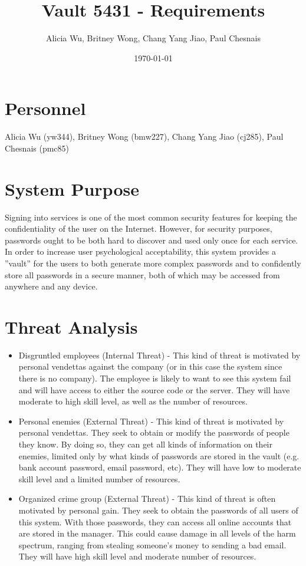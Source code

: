 \documentclass{article}
\title{Vault 5431 - Requirements}
\author{Alicia Wu, Britney Wong, Chang Yang Jiao, Paul Chesnais}
\date{\today}
\begin{document}
\maketitle
\thispagestyle{empty}

\section{Personnel}
\label{sec:personel}
Alicia Wu (yw344), Britney Wong (bmw227), Chang Yang Jiao (cj285), Paul Chesnais (pmc85)

\section{System Purpose}
\label{sec:system_purpose}

Signing into services is one of the most common security features for keeping the confidentiality of the user on the Internet. However, for security purposes, passwords ought to be both hard to discover and used only once for each service. In order to increase user psychological acceptability, this system provides a ''vault'' for the users to both generate more complex passwords and to confidently store all passwords in a secure manner, both of which may be accessed from anywhere and any device.

\section{Threat Analysis}
\label{sec:threat_analysis}

\begin{itemize}
  \item Disgruntled employees (Internal Threat) - This kind of threat is motivated by personal vendettas against the company (or in this case the system since there is no company). The employee is likely to want to see this system fail and will have access to either the source code or the server. They will have moderate to high skill level, as well as the number of resources.
  \item Personal enemies (External Threat) - This kind of threat is motivated by personal vendettas. They seek to obtain or modify the passwords of people they know. By doing so, they can get all kinds of information on their enemies, limited only by what kinds of passwords are stored in the vault (e.g. bank account password, email password, etc). They will have low to moderate skill level and a limited number of resources.
  \item Organized crime group (External Threat) - This kind of threat is often motivated by personal gain. They seek to obtain the passwords of all users of this system. With those passwords, they can access all online accounts that are stored in the manager. This could cause damage in all levels of the harm spectrum, ranging from stealing someone’s money to sending a bad email. They will have high skill level and moderate number of resources.
\end{itemize}
\end{document}
